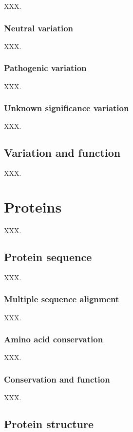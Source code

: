 XXX.

\subsubsection{Neutral variation}

XXX.

\subsubsection{Pathogenic variation}

XXX.

\subsubsection{Unknown significance variation}

XXX.

\subsection{Variation and function}

XXX.

\section{Proteins}

XXX.

\subsection{Protein sequence}

XXX.

\subsubsection{Multiple sequence alignment}

XXX.

\subsubsection{Amino acid conservation}

XXX.

\subsubsection{Conservation and function}

XXX.

\subsection{Protein structure}

